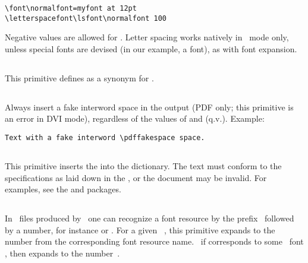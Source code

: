 \documentclass{pdftexmanual}
\begin{document}
\begin{verbatim}
\font\normalfont=myfont at 12pt
\letterspacefont\lsfont\normalfont 100
\end{verbatim}

Negative values are allowed for .
Letter spacing works natively in \PDF\ mode only, unless special fonts are
devised (in our example, a  font), as with font expansion.

\subsection{}

This primitive defines  as a synonym for
.

\subsection{}

Always insert a fake interword space in the output (PDF only; this
primitive is an error in DVI mode), regardless of the values of
 and  (q.v.). Example:

\begin{verbatim}
Text with a fake interword \pdffakespace space.
\end{verbatim}

\subsection{}

This primitive inserts the  into the
 dictionary. The text must conform to the specifications as
laid down in the \PDFReference, or the document may be invalid. For
examples, see the  and  packages.

\subsection{}

In \PDF\ files produced by \PDFTEX\ one can recognize a font resource
by the prefix~ followed by a number, for instance 
or .  For a given \TEX\ , this primitive
expands to the number from the corresponding font resource name.
\Eg\ if  corresponds to some \TEX\ font , then
 expands to the number~.
\end{document}

